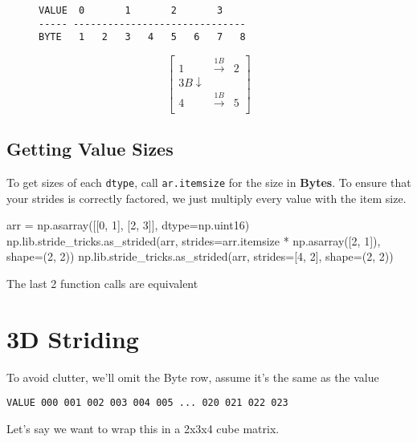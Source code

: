 \documentclass[oneside, 12pt]{report}
\begin{document}
\begin{figure}[H]
\begin{verbatim}
VALUE  0       1       2       3   
----- ------------------------------
BYTE   1   2   3   4   5   6   7   8
\end{verbatim}
\end{figure}

\begin{figure}[H]
\begin{equation*}
\begin{bmatrix}
1 & \xrightarrow{1B} & 2 \\
3B \downarrow \\
4 & \xrightarrow{1B} & 5 \\
\end{bmatrix}
\end{equation*}
\end{figure}

\subsection{Getting Value Sizes}

To get sizes of each \verb+dtype+, call \verb+ar.itemsize+ for the size in \textbf{Bytes}. To ensure that your strides is correctly factored, we just multiply every value with the item size.

\begin{python}
arr = np.asarray([[0, 1], [2, 3]], dtype=np.uint16)
np.lib.stride_tricks.as_strided(arr,
                                strides=arr.itemsize * np.asarray([2, 1]),
                                shape=(2, 2))
np.lib.stride_tricks.as_strided(arr,
                                strides=[4, 2], shape=(2, 2))
\end{python}

The last 2 function calls are equivalent

\newpage
\section{3D Striding}

To avoid clutter, we'll omit the Byte row, assume it's the same as the value

\begin{verbatim}
VALUE 000 001 002 003 004 005 ... 020 021 022 023
\end{verbatim}

Let's say we want to wrap this in a 2x3x4 cube matrix.
\end{document}
